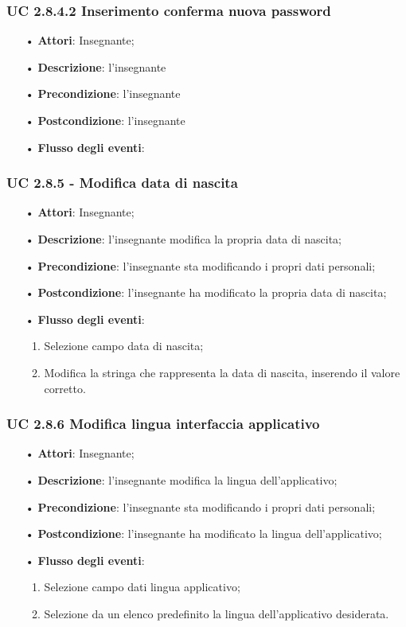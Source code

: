 \subsubsection{UC 2.8.4.2 Inserimento conferma nuova password}
\begin{itemize}
	\item[•] \textbf{Attori}: Insegnante;
	\item[•] \textbf{Descrizione}: l'insegnante
	\item[•] \textbf{Precondizione}: l'insegnante
	\item[•] \textbf{Postcondizione}: l'insegnante
	\item[•] \textbf{Flusso degli eventi}: 
\end{itemize}

	
	
\subsubsection{UC 2.8.5 - Modifica data di nascita}
\begin{itemize}
	\item[•]\textbf{Attori}: Insegnante;
	\item[•]\textbf{Descrizione}: l'insegnante modifica la propria data di nascita;
	\item[•]\textbf{Precondizione}: l'insegnante sta modificando i propri dati personali;
	\item[•]\textbf{Postcondizione}: l'insegnante ha modificato la propria data di nascita; 
	\item[•]\textbf{Flusso degli eventi}: 
	\begin{enumerate}
		\item Selezione campo data di nascita;
		\item Modifica la stringa che rappresenta la data di nascita, inserendo il valore corretto.
	\end{enumerate}
\end{itemize}

\subsubsection{UC 2.8.6 Modifica lingua interfaccia applicativo}
\begin{itemize}
	\item[•]\textbf{Attori}: Insegnante;
	\item[•]\textbf{Descrizione}: l'insegnante modifica la lingua dell'applicativo;
	\item[•]\textbf{Precondizione}: l'insegnante sta modificando i propri dati personali;
	\item[•]\textbf{Postcondizione}: l'insegnante ha modificato la lingua dell'applicativo; 
	\item[•]\textbf{Flusso degli eventi}: 
	\begin{enumerate}
		\item Selezione campo dati lingua applicativo;
		\item Selezione da un elenco predefinito la lingua dell'applicativo desiderata.
	\end{enumerate}
\end{itemize}

